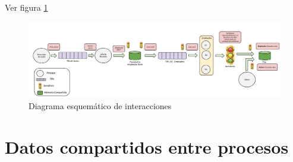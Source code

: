 \documentclass[12pt,a4paper,spanish]{article}
\begin{document}
	Ver figura \ref{diagrama}

\begin{figure}
\label{diagrama}
\includegraphics[angle=90, scale = 0.34]{esquema.png}
\centering
\caption{Diagrama esquemático de interacciones}
\end{figure}

\newpage
	\section{Datos compartidos entre procesos}
	
\end{document}
